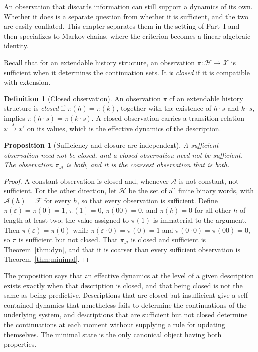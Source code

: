 \documentclass[11pt,oneside]{book}
\newtheorem{proposition}[theorem]{Proposition}
\theoremstyle{definition}
\newtheorem{definition}[theorem]{Definition}
\theoremstyle{remark}
\newcommand{\Hist}{\mathcal{H}}
\newcommand{\Fut}{\mathcal{F}}
\newcommand{\Adm}{\mathcal{A}}
\newcommand{\Obs}{\mathcal{X}}
\begin{document}
An observation that discards information can still support a dynamics of its own. Whether it does is a separate question from whether it is sufficient, and the two are easily conflated. This chapter separates them in the setting of Part~I and then specializes to Markov chains, where the criterion becomes a linear-algebraic identity.

Recall that for an extendable history structure, an observation $\pi\colon\Hist\to\Obs$ is sufficient when it determines the continuation sets. It is \emph{closed} if it is compatible with extension.

\begin{definition}[Closed observation]
An observation $\pi$ of an extendable history structure is \emph{closed} if $\pi(h)=\pi(k)$, together with the existence of $h\cdot s$ and $k\cdot s$, implies $\pi(h\cdot s)=\pi(k\cdot s)$. A closed observation carries a transition relation $x\xrightarrow{s}x'$ on its values, which is the effective dynamics of the description.
\end{definition}

\begin{proposition}[Sufficiency and closure are independent]\label{prop:independent}
A sufficient observation need not be closed, and a closed observation need not be sufficient. The observation $\pi_\Adm$ is both, and it is the coarsest observation that is both.
\end{proposition}

\begin{proof}
A constant observation is closed and, whenever $\Adm$ is not constant, not sufficient. For the other direction, let $\Hist$ be the set of all finite binary words, with $\Adm(h)=\Fut$ for every $h$, so that every observation is sufficient. Define $\pi(\varepsilon)=\pi(0)=1$, $\pi(1)=0$, $\pi(00)=0$, and $\pi(h)=0$ for all other $h$ of length at least two; the value assigned to $\pi(1)$ is immaterial to the argument. Then $\pi(\varepsilon)=\pi(0)$ while $\pi(\varepsilon\cdot0)=\pi(0)=1$ and $\pi(0\cdot0)=\pi(00)=0$, so $\pi$ is sufficient but not closed. That $\pi_\Adm$ is closed and sufficient is Theorem~\ref{thm:dyn}, and that it is coarser than every sufficient observation is Theorem~\ref{thm:minimal}.
\end{proof}

The proposition says that an effective dynamics at the level of a given description exists exactly when that description is closed, and that being closed is not the same as being predictive. Descriptions that are closed but insufficient give a self-contained dynamics that nonetheless fails to determine the continuations of the underlying system, and descriptions that are sufficient but not closed determine the continuations at each moment without supplying a rule for updating themselves. The minimal state is the only canonical object having both properties.
\end{document}
